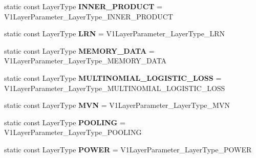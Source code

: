 \begin{DoxyCompactItemize}
\mbox{\label{classcaffe_1_1_v1_layer_parameter_af90285c62113edcc5fa251be0eb05559}} 
static const Layer\+Type {\bfseries I\+N\+N\+E\+R\+\_\+\+P\+R\+O\+D\+U\+CT} = V1\+Layer\+Parameter\+\_\+\+Layer\+Type\+\_\+\+I\+N\+N\+E\+R\+\_\+\+P\+R\+O\+D\+U\+CT
\item 
\mbox{\label{classcaffe_1_1_v1_layer_parameter_af8e42454373b0006ad82fa81d4f2bf3c}} 
static const Layer\+Type {\bfseries L\+RN} = V1\+Layer\+Parameter\+\_\+\+Layer\+Type\+\_\+\+L\+RN
\item 
\mbox{\label{classcaffe_1_1_v1_layer_parameter_ab71bcc8e4a4fb2b2581b4d70638c36a7}} 
static const Layer\+Type {\bfseries M\+E\+M\+O\+R\+Y\+\_\+\+D\+A\+TA} = V1\+Layer\+Parameter\+\_\+\+Layer\+Type\+\_\+\+M\+E\+M\+O\+R\+Y\+\_\+\+D\+A\+TA
\item 
\mbox{\label{classcaffe_1_1_v1_layer_parameter_a151d88d2cf763376b1816fcf8b69a099}} 
static const Layer\+Type {\bfseries M\+U\+L\+T\+I\+N\+O\+M\+I\+A\+L\+\_\+\+L\+O\+G\+I\+S\+T\+I\+C\+\_\+\+L\+O\+SS} = V1\+Layer\+Parameter\+\_\+\+Layer\+Type\+\_\+\+M\+U\+L\+T\+I\+N\+O\+M\+I\+A\+L\+\_\+\+L\+O\+G\+I\+S\+T\+I\+C\+\_\+\+L\+O\+SS
\item 
\mbox{\label{classcaffe_1_1_v1_layer_parameter_a250af0cd86643e18690e93f3615bbec3}} 
static const Layer\+Type {\bfseries M\+VN} = V1\+Layer\+Parameter\+\_\+\+Layer\+Type\+\_\+\+M\+VN
\item 
\mbox{\label{classcaffe_1_1_v1_layer_parameter_ad38c9bbf7dafdd58c472ea95ff7fe05d}} 
static const Layer\+Type {\bfseries P\+O\+O\+L\+I\+NG} = V1\+Layer\+Parameter\+\_\+\+Layer\+Type\+\_\+\+P\+O\+O\+L\+I\+NG
\item 
\mbox{\label{classcaffe_1_1_v1_layer_parameter_ae062572f1a8ad3edac89f85893fedc79}} 
static const Layer\+Type {\bfseries P\+O\+W\+ER} = V1\+Layer\+Parameter\+\_\+\+Layer\+Type\+\_\+\+P\+O\+W\+ER
\item 
\mbox{\label{classcaffe_1_1_v1_layer_parameter_aa3ffaeb12a55c2ae3667802d9bfc7fe7}} 

\end{DoxyCompactItemize}
